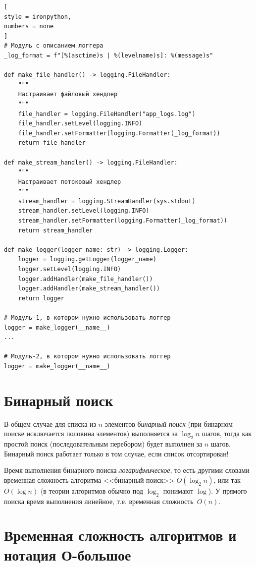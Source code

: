 \documentclass[%
	11pt,
	a4paper,
	utf8,
		]{article}
\begin{document}
\begin{lstlisting}[
style = ironpython,
numbers = none	
]
# Модуль с описанием логгера
_log_format = f"[%(asctime)s | %(levelname)s]: %(message)s"

def make_file_handler() -> logging.FileHandler:
	"""
	Настраивает файловый хендлер
	"""
	file_handler = logging.FileHandler("app_logs.log")
	file_handler.setLevel(logging.INFO)
	file_handler.setFormatter(logging.Formatter(_log_format))
	return file_handler

def make_stream_handler() -> logging.FileHandler:
	"""
	Настраивает потоковый хендлер
	"""
	stream_handler = logging.StreamHandler(sys.stdout)
	stream_handler.setLevel(logging.INFO)
	stream_handler.setFormatter(logging.Formatter(_log_format))
	return stream_handler

def make_logger(logger_name: str) -> logging.Logger:
	logger = logging.getLogger(logger_name)
	logger.setLevel(logging.INFO)
	logger.addHandler(make_file_handler())
	logger.addHandler(make_stream_handler())
	return logger

# Модуль-1, в котором нужно использовать логгер
logger = make_logger(__name__)
...

# Модуль-2, в котором нужно использовать логгер
logger = make_logger(__name__)
\end{lstlisting}



\section{Бинарный поиск}

В общем случае для списка из $ n $ элементов \emph{бинарный поиск} (при бинарном поиске исключается половина элементов) выполняется за $ \log_2 n $ шагов, тогда как простой поиск (последовательным перебором) будет выполнен за $ n $ шагов. Бинарный поиск работает только в том случае, если список отсортирован!

Время выполнения бинарного поиска \emph{логарифмическое}, то есть другими словами временная сложность алгоритма <<бинарный поиск>> $ O(\log_2 n) $, или так $ O(\log n) $ (в теории алгоритмов обычно под $ \log_2 $ понимают $ \log $). У прямого поиска время выполнения линейное, т.е. временная сложность~$ O(n) $.

\section{Временная сложность алгоритмов и нотация О-большое}
\end{document}

